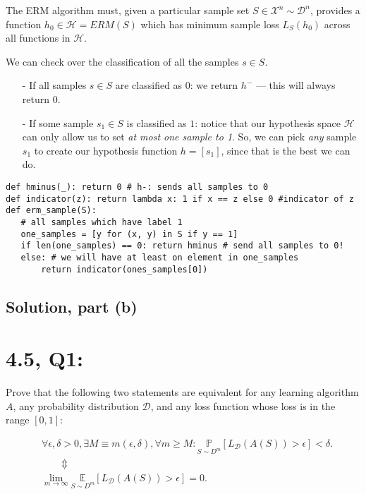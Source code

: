\documentclass[11pt]{article}
\newcommand{\D}{\ensuremath{\mathcal{D}}}
\renewcommand{\H}{\ensuremath{\mathcal{H}}}
\newcommand{\X}{\ensuremath{\mathcal{X}}}
\begin{document}
The ERM algorithm must, given a particular sample set $S \in \X^n \sim \D^n$,
provides a function $h_0 \in \H = ERM(S)$ which has minimum sample loss
$L_S(h_0)$ across all functions in $\H$.

We can check over the classification of all the samples $s \in S$.
\begin{itemize}
    \item[-] If all samples $s \in S $ are classified as $0$:
        we return $h^-$ --- this will always return $0$.
    \item[-] If some sample $s_1 \in S$ is classified as $1$: notice that
        our hypothesis space $\H$ can only allow us to set
        \emph{at most one sample to 1}. So, we can pick \emph{any} sample
        $s_1$ to create our hypothesis function $h = [s_1]$, since that
        is the best we can do.
\end{itemize}

\begin{verbatim}
def hminus(_): return 0 # h-: sends all samples to 0
def indicator(z): return lambda x: 1 if x == z else 0 #indicator of z
def erm_sample(S):
   # all samples which have label 1
   one_samples = [y for (x, y) in S if y == 1]
   if len(one_samples) == 0: return hminus # send all samples to 0!
   else: # we will have at least on element in one_samples
       return indicator(ones_samples[0])
\end{verbatim}


\subsection*{Solution, part (b)}

\section*{4.5, Q1:}
Prove that the following two statements are equivalent for any learning
algorithm $A$, any probability distribution $\D$, and any loss function
whose loss is in the range $[0, 1]$:

\begin{align*}
    &\forall \epsilon, \delta > 0, \exists M \equiv m(\epsilon, \delta), \forall m \geq M :
    \underset{S \sim D^m }{\mathbb P}[L_\D(A(S)) > \epsilon] < \delta. \\
    & \qquad \Updownarrow \\
    &\lim_{m \rightarrow \infty} \underset{S \sim D^m }{\mathbb E}[L_\D(A(S)) > \epsilon] = 0. \\
\end{align*}
\end{document}
